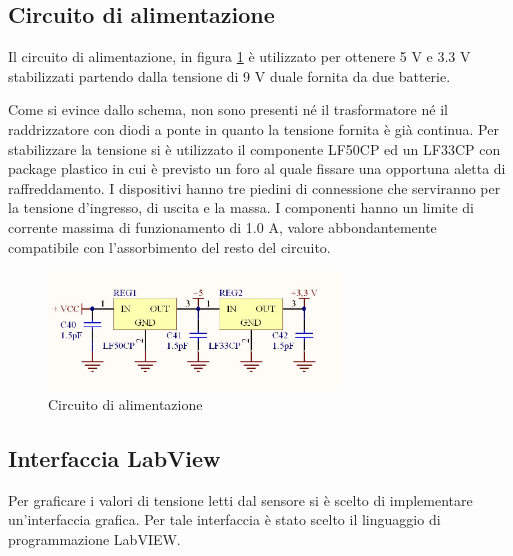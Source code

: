 \documentclass[12pt,a4paper,oneside,openright,italian]{article}
\begin{document}
\subsection{Circuito di alimentazione}
Il circuito di alimentazione, in figura \ref{alimentazione} \`e utilizzato per ottenere 5 V e 3.3 V stabilizzati partendo dalla tensione di 9 V duale fornita da due batterie.

Come si evince dallo schema, non sono presenti n\'e il trasformatore n\'e il raddrizzatore con diodi a ponte in quanto la tensione fornita \`e gi\`a continua. Per stabilizzare la tensione si \`e utilizzato il componente LF50CP ed un LF33CP con package plastico in cui \`e previsto un foro al quale fissare una opportuna aletta di raffreddamento. I dispositivi hanno tre piedini di connessione che serviranno per la tensione d'ingresso, di uscita e la massa. I componenti hanno un limite di corrente massima di funzionamento di 1.0 A, valore abbondantemente compatibile con l'assorbimento del resto del circuito.

\begin{figure}[!hbp]
  \centering
  \includegraphics[width=220pt]{immagini/alimentazione.jpg}
  \caption{Circuito di alimentazione}
  \label{alimentazione}
\end{figure}

\subsection{Interfaccia LabView}
Per graficare i valori di tensione letti dal sensore si \`e scelto di implementare un'interfaccia grafica. Per tale interfaccia \`e stato scelto il linguaggio di programmazione LabVIEW.
\end{document}
